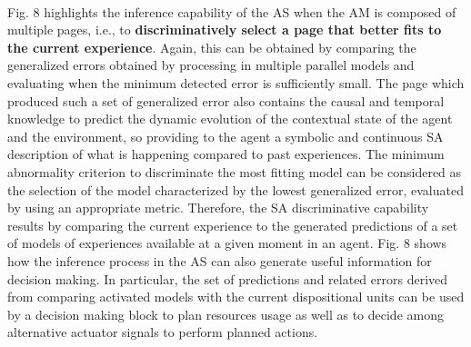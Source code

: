 \documentclass{article}
\begin{document}
		\paragraph{} \citet{regazzoni-2020-multi-sensorial-generative-and-descriptive-self-awareness-models-for-autonomous-systems}Fig. 8 highlights the inference capability of the AS when
		the AM is composed of multiple pages, i.e., to \textbf{discriminatively
		select a page that better fits to the current experience}. Again,
		this can be obtained by comparing the generalized errors obtained by processing in multiple parallel models and evaluating
		when the minimum detected error is sufficiently small. The
		page which produced such a set of generalized error also
		contains the causal and temporal knowledge to predict the
		dynamic evolution of the contextual state of the agent and
		the environment, so providing to the agent a symbolic and
		continuous SA description of what is happening compared
		to past experiences. The minimum abnormality criterion to
		discriminate the most fitting model can be considered as the
		selection of the model characterized by the lowest generalized
		error, evaluated by using an appropriate metric. Therefore, the
		SA discriminative capability results by comparing the current
		experience to the generated predictions of a set of models of
		experiences available at a given moment in an agent. \citet{regazzoni-2020-multi-sensorial-generative-and-descriptive-self-awareness-models-for-autonomous-systems}Fig. 8
		shows how the inference process in the AS can also generate
		useful information for decision making. In particular, the set of predictions and related errors derived from comparing
		activated models with the current dispositional units can be
		used by a decision making block to plan resources usage as
		well as to decide among alternative actuator signals to perform
		planned actions.
		
\end{document}
